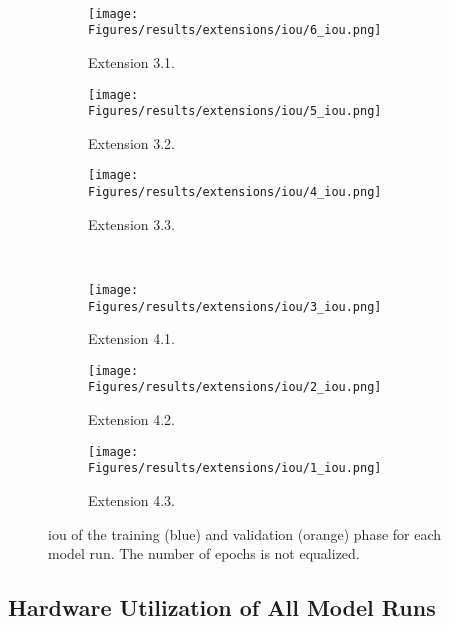 \begin{figure}[!htb]
    \\
    \begin{subfigure}{.325\textwidth}
        \centering
        \texttt{[image: Figures/results/extensions/iou/6\_iou.png]}
        \caption{Extension 3.1.}
    \end{subfigure}
    \begin{subfigure}{.325\textwidth}
        \centering
        \texttt{[image: Figures/results/extensions/iou/5\_iou.png]}
        \caption{Extension 3.2.}
    \end{subfigure}
    \begin{subfigure}{.325\textwidth}
        \centering
        \texttt{[image: Figures/results/extensions/iou/4\_iou.png]}
        \caption{Extension 3.3.}
    \end{subfigure}
    \\
    \begin{subfigure}{.325\textwidth}
        \centering
        \texttt{[image: Figures/results/extensions/iou/3\_iou.png]}
        \caption{Extension 4.1.}
    \end{subfigure}
    \begin{subfigure}{.325\textwidth}
        \centering
        \texttt{[image: Figures/results/extensions/iou/2\_iou.png]}
        \caption{Extension 4.2.}
    \end{subfigure}
    \begin{subfigure}{.325\textwidth}
        \centering
        \texttt{[image: Figures/results/extensions/iou/1\_iou.png]}
        \caption{Extension 4.3.}
    \end{subfigure}
    \caption[ Plots of All Model Runs]{\gls{iou} of the training (blue) and validation (orange) phase for each model run. The number of epochs is not equalized.}
\end{figure}

\clearpage

\subsection{Hardware Utilization of All Model Runs}
\label{app:efficiency}

